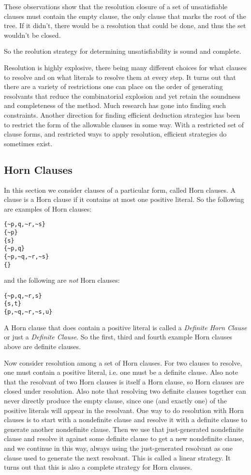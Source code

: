 These observations show that the resolution closure of a set of
unsatisfiable clauses must contain the empty clause, the only clause
that marks the root of the tree.  If it didn't, there would be a
resolution that could be done, and thus the set wouldn't be closed.

So the reolution strategy for determining unsatisfiability is sound
and complete.

Resolution is highly explosive, there being many different choices for
what clauses to resolve and on what literals to resolve them at every
step.  It turns out that there are a variety of restrictions one can
place on the order of generating resolvants that reduce the
combinatorial explosion and yet retain the soundness and completeness
of the method.  Much research has gone into finding such constraints.
Another direction for finding efficient deduction strategies has been
to restrict the form of the allowable clauses in some way.  With a
restricted set of clause forms, and restricted ways to apply
resolution, efficient strategies do sometimes exist.

\subsection{Horn Clauses}

In this section we consider clauses of a particular form, called Horn
clauses.  A clause is a Horn clause if it contains at most one
positive literal.  So the following are examples of Horn clauses:
\begin{verbatim}
{~p,q,~r,~s}
{~p}
{s}
{~p,q}
{~p,~q,~r,~s}
{}
\end{verbatim}
and the following are {\em not} Horn clauses:
\begin{verbatim}
{~p,q,~r,s}
{s,t}
{p,~q,~r,~s,u}
\end{verbatim}
A Horn clause that does contain a positive literal is called a {\em
Definite Horn Clause} or just a {\em Definite Clause}.  So the first,
third and fourth example Horn clauses above are definite clauses.  

Now consider resolution among a set of Horn clauses.  For two clauses
to resolve, one must contain a positive literal, i.e. one must be a
definite clause.  Also note that the resolvant of two Horn clauses is
itself a Horn clause, so Horn clauses are closed under resolution.
Also note that resolving two definite clauses together can never
directly produce the empty clause, since one (and exactly one) of the
positive literals will appear in the resolvant.  One way to do
resolution with Horn clauses is to start with a nondefinite clause and
resolve it with a definite clause to generate another nondefinite
clause.  Then we use that just-generated nondefinite clause and
resolve it against some definite clause to get a new nondefinite
clause, and we continue in this way, always using the just-generated
resolvant as one clause used to generate the next resolvant.  This is
called a linear strategy.  It turns out that this is also a complete
strategy for Horn clauses.

